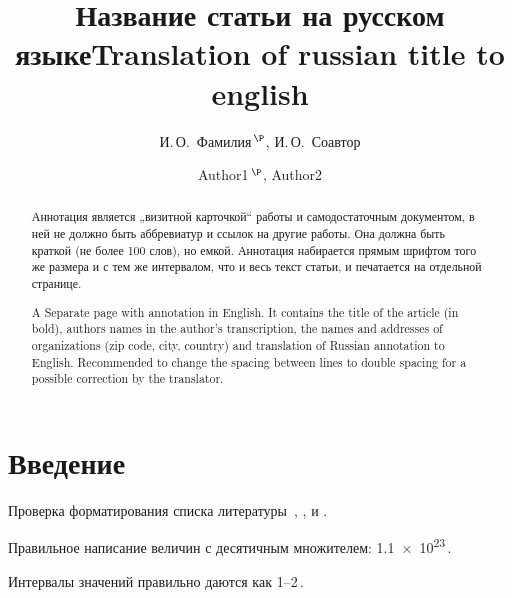 \documentclass[14pt]{extarticle}
\begin{document}
\title{Название статьи на русском языке}
\author{И.\,О.~Фамилия$^{\,\P}$, И.\,О.~Соавтор}
\address{Физико-технический институт им. А. Ф. Иоффе Российской академии наук, \\
		194021, Санкт-Петербург, Россия.}
\maketitle

\begin{abstract}
	Аннотация является „визитной карточкой“ работы и самодостаточным документом,
	в ней не должно быть аббревиатур и ссылок на другие работы. Она должна быть краткой
	(не более 100 слов), но емкой. Аннотация набирается прямым шрифтом того же размера
	и с тем же интервалом, что и весь текст статьи, и печатается на отдельной странице.
\end{abstract}


\begin{otherlanguage}{english}
	\title{Translation of russian title to english}
	\author{Author1$^{\,\P}$, Author2}
	\address{Ioffe Physicotechnical Institute, Russian Academy of Sciences, \\
			194021, St. Petersburg, Russia.}
	\maketitle
	
	\begin{abstract}
		A Separate page with annotation in English. It contains the title of the article (in bold), authors names in the author's transcription, the names and addresses of organizations (zip code, city, country) and translation of Russian annotation to English.  Recommended to change the spacing between lines to double spacing for a possible correction by the translator.
	\end{abstract}
\end{otherlanguage}

\section{Введение}
Проверка форматирования списка литературы~\cite{ref1,ref2,ref3},
\cite{ref4},
\cite{ref5,ref5eng,ref6} и 
\cite{ref7,ref8,ref9}.

Правильное написание величин с десятичным множителем: 
\num{1,1e23}\,. \par
Интервалы значений правильно даются как \numrange{1}{2}\,\ph{\si{\angstrom}}. 
\par
\end{document}
